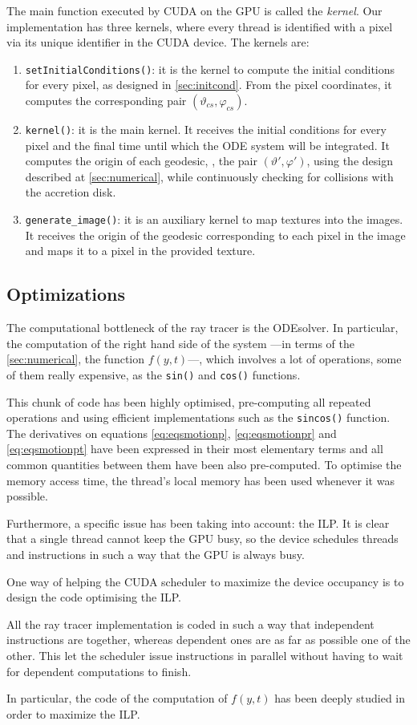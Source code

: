 The main function executed by \ac{CUDA} on the \ac{GPU} is called the \emph{kernel}. Our implementation has three kernels, where every thread is identified with a pixel via its unique identifier in the \ac{CUDA} device. The kernels are:
\begin{enumerate}
	\item \lstinline{setInitialConditions()}: it is the kernel to compute the initial conditions for every pixel, as designed in \autoref{sec:initcond}. From the pixel coordinates, it computes the corresponding pair $(\vartheta_{cs}, \varphi_{cs})$.
	\item  \lstinline{kernel()}: it is the main kernel. It receives the initial conditions for every pixel and the final time until which the \ac{ODE} system will be integrated. It computes the origin of each geodesic, \ie, the pair $(\vartheta', \varphi')$, using the design described at \autoref{sec:numerical}, while continuously checking for collisions with the accretion disk.
	\item \lstinline{generate_image()}: it is an auxiliary kernel to map textures into the images. It receives the origin of the geodesic corresponding to each pixel in the image and maps it to a pixel in the provided texture.
\end{enumerate}

\subsection{Optimizations}

The computational bottleneck of the ray tracer is the \ac{ODE}solver. In particular, the computation of the right hand side of the system ---in terms of the \autoref{sec:numerical}, the function $f(y,t)$---, which involves a lot of operations, some of them really expensive, as the \lstinline{sin()} and \lstinline{cos()} functions.

This chunk of code has been highly optimised, pre-computing all repeated operations and using efficient implementations such as the \lstinline{sincos()} function. The derivatives on equations \ref{eq:eqsmotionp}, \ref{eq:eqsmotionpr} and \ref{eq:eqsmotionpt} have been expressed in their most elementary terms and all common quantities between them have been also pre-computed. To optimise the memory access time, the thread's local memory has been used whenever it was possible.

Furthermore, a specific issue has been taking into account: the \ac{ILP}. It is clear that a single thread cannot keep the \ac{GPU} busy, so the device schedules threads and instructions in such a way that the \ac{GPU} is always busy.

One way of helping the \ac{CUDA} scheduler to maximize the device occupancy is to design the code optimising the \ac{ILP}.

All the ray tracer implementation is coded in such a way that independent instructions are together, whereas dependent ones are as far as possible one of the other. This let the scheduler issue instructions in parallel without having to wait for dependent computations to finish.

In particular, the code of the computation of $f(y,t)$ has been deeply studied in order to maximize the \ac{ILP}.